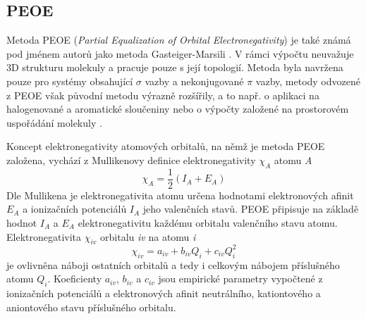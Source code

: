 \subsection{PEOE}
Metoda PEOE (\textit{Partial Equalization of Orbital Electronegativity}) je také známá pod jménem autorů jako metoda Gasteiger-Marsili \cite{GM}. V rámci výpočtu neuvažuje 3D strukturu molekuly a pracuje pouze s její topologií. Metoda byla navržena pouze pro systémy obsahující $\sigma$ vazby a nekonjugované $\pi$ vazby, metody odvozené z PEOE však původní metodu výrazně rozšířily, a to např. o aplikaci na halogenované a aromatické sloučeniny \cite{MPEOE_aromatic} nebo o výpočty založené na prostorovém uspořádání molekuly \cite{GDAC}.  

Koncept elektronegativity atomových orbitalů, na němž je metoda PEOE založena, vychází z Mullikenovy definice elektronegativity $\chi_A$ atomu \textit{A}
\begin{equation}
    \chi_A = \frac{1}{2}(I_A + E_A)
\end{equation}
Dle Mullikena je elektronegativita atomu určena hodnotami elektronových afinit $ E_A$ a ionizačních potenciálů $I_A$ jeho valenčních stavů. PEOE připisuje na základě hodnot $I_A$ a $ E_A$ elektronegativitu každému orbitalu valenčního stavu atomu. Elektronegativita $\chi_{iv}$ orbitalu \textit{iv} na atomu \textit{i}
\begin{equation}
\label{PEOE_elneg}
    \chi_{iv} = a_{iv} + b_{iv}Q_i + c_{iv}Q_i^2
\end{equation}
je ovlivněna náboji ostatních orbitalů a tedy i celkovým nábojem příslušného atomu $Q_i$. Koeficienty $a_{iv}$, $b_{iv}$ a $c_{iv}$ jsou empirické parametry vypočtené z ionizačních potenciálů a elektronových afinit neutrálního, kationtového a aniontového stavu příslušného orbitalu.

